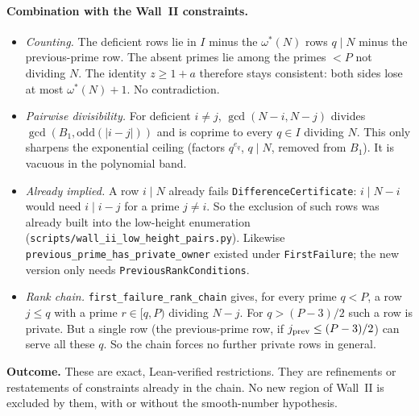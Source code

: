 \documentclass[11pt,a4paper]{article}
\theoremstyle{remark}
\begin{document}
\paragraph{Combination with the Wall~II constraints.}
\begin{itemize}
\item \emph{Counting.} The deficient rows lie in $I$ minus the $\omega^*(N)$ rows $q\mid N$ minus the previous-prime row. The absent
primes lie among the primes $<P$ not dividing $N$. The identity $z\ge1+a$ therefore stays consistent: both sides lose at most
$\omega^*(N)+1$. No contradiction.
\item \emph{Pairwise divisibility.} For deficient $i\ne j$, $\gcd(N-i,N-j)$ divides $\gcd(B_1,\mathrm{odd}(|i-j|))$ and is coprime to
every $q\in I$ dividing $N$. This only sharpens the exponential ceiling (factors $q^{e_q}$, $q\mid N$, removed from $B_1$). It is
vacuous in the polynomial band.
\item \emph{Already implied.} A row $i\mid N$ already fails \texttt{DifferenceCertificate}: $i\mid N-i$ would need $i\mid i-j$ for a
prime $j\ne i$. So the exclusion of such rows was already built into the low-height enumeration
(\texttt{scripts/wall\_ii\_low\_height\_pairs.py}). Likewise \texttt{previous\_prime\_has\_private\_owner} existed under
\texttt{FirstFailure}; the new version only needs \texttt{PreviousRankConditions}.
\item \emph{Rank chain.} \texttt{first\_failure\_rank\_chain} gives, for every prime $q<P$, a row $j\le q$ with a prime $r\in[q,P)$
dividing $N-j$. For $q>(P-3)/2$ such a row is private. But a single row (the previous-prime row, if $j_{\rm prev}\le(P-3)/2$)
can serve all these $q$. So the chain forces no further private rows in general.
\end{itemize}
\textbf{Outcome.} These are exact, Lean-verified restrictions. They are refinements or restatements of constraints already in
the chain. No new region of Wall~II is excluded by them, with or without the smooth-number hypothesis.
\end{document}
